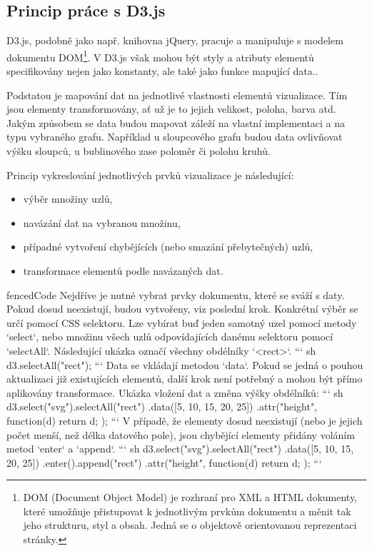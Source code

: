 \documentclass[
  digital, %
  oneside, %
  table,   %
  nolof,     %
  nolot,     %
]{fithesis3}
\begin{document}
\subsection{Princip práce s D3.js}
D3.js, podobně jako např. knihovna jQuery, pracuje a manipuluje s modelem dokumentu DOM\footnote{DOM (Document Object Model) je rozhraní pro XML a HTML dokumenty, které umožňuje přistupovat k jednotlivým prvkům dokumentu a měnit tak jeho strukturu, styl a obsah. Jedná se o objektově orientovanou reprezentaci stránky.}. V D3.js však mohou být styly a atributy elementů specifikovány nejen jako konstanty, ale také jako funkce mapující data.\cite{d3jsorg}.\par
Podstatou je mapování dat na jednotlivé vlastnosti elementů vizualizace. Tím jsou elementy transformovány, ať už je to jejich velikost, poloha, barva atd. Jakým způsobem se data budou mapovat záleží na vlastní implementaci a na typu vybraného grafu. Například u sloupcového grafu budou data ovlivňovat výšku sloupců, u bublinového zase poloměr či polohu kruhů. \cite{interactiveVisualizationBook}\par
Princip vykreslování jednotlivých prvků vizualizace je následující:
\begin{itemize}
  \item výběr množiny uzlů,
  \item navázání dat na vybranou množinu,
  \item případné vytvoření chybějících (nebo smazání přebytečných) uzlů,
  \item transformace elementů podle navázaných dat.
\end{itemize}
\begin{markdown*}{
  fencedCode
}
Nejdříve je nutné vybrat prvky dokumentu, které se sváží s daty. Pokud dosud neexistují, budou vytvořeny, viz poslední krok. Konkrétní výběr se určí pomocí CSS selektoru.
Lze vybírat buď jeden samotný uzel pomocí metody `select`, nebo množinu všech uzlů odpovídajících danému selektoru pomocí `selectAll`. Následující ukázka označí všechny obdélníky `<rect>`.
``` sh
	d3.selectAll("rect"); 
```
Data se vkládají metodou `data`. Pokud se jedná o pouhou aktualizaci již existujících elementů, další krok není potřebný a mohou být přímo aplikovány transformace. Ukázka vložení dat a změna výšky obdélníků:
``` sh
	d3.select("svg").selectAll("rect")
	  .data([5, 10, 15, 20, 25])
	  .attr("height", function(d) { return d; });
```
V případě, že elementy dosud neexistují (nebo je jejich počet menší, než délka datového pole), jsou chybějící elementy přidány voláním metod `enter` a `append`.
``` sh
	d3.select("svg").selectAll("rect")
	  .data([5, 10, 15, 20, 25])
	  .enter().append("rect")
	  .attr("height", function(d) { return d; });
```
\end{markdown*}
\end{document}
